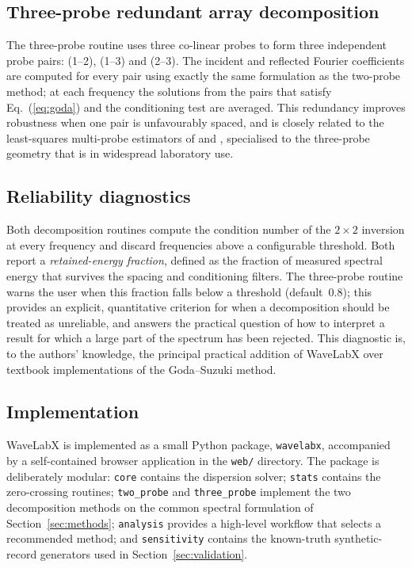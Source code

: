\documentclass[preprint,12pt,a4paper]{elsarticle}
\begin{document}
\subsection{Three-probe redundant array decomposition}
The three-probe routine uses three co-linear probes to form three
independent probe pairs: (1--2), (1--3) and (2--3). The incident and
reflected Fourier coefficients are computed for every pair using
exactly the same formulation as the two-probe method; at each frequency
the solutions from the pairs that satisfy Eq.~(\ref{eq:goda}) and the
conditioning test are averaged. This redundancy improves robustness
when one pair is unfavourably spaced, and is closely related to the
least-squares multi-probe estimators of \citet{mansard1980measurement}
and \citet{kobayashi1990reflection}, specialised to the three-probe
geometry that is in widespread laboratory use.

\subsection{Reliability diagnostics}
Both decomposition routines compute the condition number of the
$2\times 2$ inversion at every frequency and discard frequencies above
a configurable threshold. Both report a \emph{retained-energy
fraction}, defined as the fraction of measured spectral energy that
survives the spacing and conditioning filters. The three-probe routine
warns the user when this fraction falls below a threshold
(default~0.8); this provides an explicit, quantitative criterion for
when a decomposition should be treated as unreliable, and answers the
practical question of how to interpret a result for which a large part
of the spectrum has been rejected. This diagnostic is, to the authors'
knowledge, the principal practical addition of WaveLabX over textbook
implementations of the Goda--Suzuki method.

\subsection{Implementation}
WaveLabX is implemented as a small Python package, \texttt{wavelabx},
accompanied by a self-contained browser application in the
\texttt{web/} directory. The package is deliberately modular:
\texttt{core} contains the dispersion solver; \texttt{stats} contains
the zero-crossing routines; \texttt{two\_probe} and
\texttt{three\_probe} implement the two decomposition methods on the
common spectral formulation of Section~\ref{sec:methods};
\texttt{analysis} provides a high-level workflow that selects a
recommended method; and \texttt{sensitivity} contains the known-truth
synthetic-record generators used in Section~\ref{sec:validation}.
\end{document}
